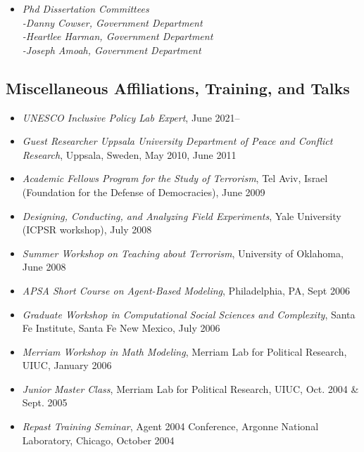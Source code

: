 \documentclass[10pt]{article}
\begin{document}
\begin{itemize}
\item \emph{Phd Dissertation Committees}
\\ \indent \textit{-Danny Cowser, Government Department}
\\ \indent \textit{-Heartlee Harman, Government Department}
\\ \indent \textit{-Joseph Amoah, Government Department}


\end{itemize}


\subsection*{Miscellaneous Affiliations, Training, and Talks} 
\begin{itemize}
\item \textit{UNESCO Inclusive Policy Lab Expert}, June 2021--
\item \textit{Guest Researcher Uppsala University Department of Peace and Conflict Research}, Uppsala, Sweden, May 2010, June 2011
\item \textit{Academic Fellows Program for the Study of Terrorism}, Tel Aviv, Israel (Foundation for the Defense of Democracies), June 2009
\item \textit{Designing, Conducting, and Analyzing Field Experiments}, Yale University (ICPSR workshop), July 2008
\item \textit{Summer Workshop on Teaching about Terrorism}, University of Oklahoma, June 2008
\item \textit{APSA Short Course on Agent-Based Modeling}, Philadelphia, PA, Sept 2006
\item \textit{Graduate Workshop in Computational Social Sciences and Complexity}, Santa Fe Institute, Santa Fe New Mexico, July 2006
\item \textit{Merriam Workshop in Math Modeling}, Merriam Lab for Political Research, UIUC, January 2006
\item \textit{Junior Master Class}, Merriam Lab for Political Research, UIUC, Oct. 2004 \& Sept. 2005
\item \textit{Repast Training Seminar}, Agent 2004 Conference,  Argonne National Laboratory, Chicago, October 2004
\end{itemize}
\end{document}
